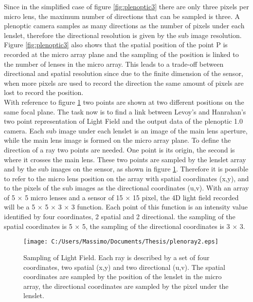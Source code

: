 Since in the simplified case of figure \ref{fig:plenoptic3} there are only three pixels per micro lens, the maximum number of directions that can be sampled is three. A plenoptic camera samples as many directions as the number of pixels under each lenslet, therefore the directional resolution is given by the sub image resolution. Figure \ref{fig:plenoptic3} also shows that the spatial position of the point P is recorded at the micro array plane and the sampling of the position is linked to the number of lenses in the micro array. This leads to a trade-off between directional and spatial resolution since due to the finite dimension of the sensor, when more pixels are used to record the direction the same amount of pixels are lost to record the position. \\
With reference to figure \ref{fig:plenoptic4} two points are shown at two different positions on the same focal plane. The task now is to find a link between Levoy's and Hanrahan's two point representation of Light Field \cite{levoy1996light,levoy2006microscope} and the output data of the plenoptic 1.0 camera. Each sub image under each lenslet is an image of the main lens aperture, while the main lens image is formed on the micro array plane. To define the direction of a ray two points are needed. One point is its origin, the second is where it crosses the main lens. These two points are sampled by the lenslet array and by the sub images on the sensor, as shown in figure \ref{fig:plenoptic4}. Therefore it is possible to refer to the micro lens position on the array with spatial coordinates (x,y), and to the pixels of the sub images as the directional coordinates (u,v). With an array of 5 $\times$ 5 micro lenses and a sensor of 15 $\times$ 15 pixel, the 4D light field recorded will be a 5 $\times$ 5 $\times$ 3 $\times$ 3 function. Each point of this function is an intensity value identified by four coordinates, 2 spatial and 2 directional. the sampling of the spatial coordinates is 5 $\times$ 5, the sampling of the directional coordinates is 3 $\times$ 3. 
\begin{figure}[H]
	\centering
	\texttt{[image: C:/Users/Massimo/Documents/Thesis/plenoray2.eps]}
	\caption{\label{fig:plenoptic4} Sampling of Light Field. Each ray is described by a set of four coordinates, two spatial (x,y) and two directional (u,v). The spatial coordinates are sampled by the position of the lenslet in the micro array, the directional coordinates are sampled by the pixel under the lenslet.}
\end{figure}
